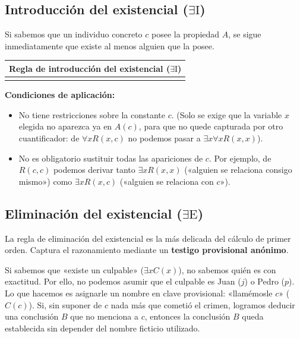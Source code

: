 \subsection{Introducción del existencial \texorpdfstring{($\exists\text{I}$)}{(Introduccion del existencial)}}

Si sabemos que un individuo concreto $c$ posee la propiedad $A$, se sigue inmediatamente que existe al menos alguien que la posee.

\begin{center}
\begin{tabular}{|c|}
\hline
\textbf{Regla de introducción del existencial ($\exists\text{I}$)} \\
\hline
\cajaregla{$\begin{nd}[rules=myrules]
    \have [m] {1} {A(c)} \by{}{}
    \have [\mbox{}] {2} {\exists x A(x)} \Ei{1}
\end{nd}$} \\
\hline
\end{tabular}
\end{center}

\noindent \textbf{Condiciones de aplicación:}
\begin{itemize}
    \item No tiene restricciones sobre la constante $c$. (Solo se exige que la variable $x$ elegida no aparezca ya en $A(c)$, para que no quede capturada por otro cuantificador: de $\forall x R(x, c)$ no podemos pasar a $\exists x \forall x R(x, x)$).
    \item No es obligatorio sustituir todas las apariciones de $c$. Por ejemplo, de $R(c, c)$ podemos derivar tanto $\exists x R(x, x)$ («alguien se relaciona consigo mismo») como $\exists x R(x, c)$ («alguien se relaciona con $c$»).
\end{itemize}

\subsection{Eliminación del existencial \texorpdfstring{($\exists\text{E}$)}{(Eliminacion del existencial)}}

La regla de eliminación del existencial es la más delicada del cálculo de primer orden. Captura el razonamiento mediante un \textbf{testigo provisional anónimo}.

Si sabemos que «existe un culpable» ($\exists x C(x)$), no sabemos quién es con exactitud. Por ello, no podemos asumir que el culpable es Juan ($j$) o Pedro ($p$). Lo que hacemos es asignarle un nombre en clave provisional: «llamémosle $c$» ($C(c)$). Si, sin suponer de $c$ nada más que cometió el crimen, logramos deducir una conclusión $B$ que no menciona a $c$, entonces la conclusión $B$ queda establecida sin depender del nombre ficticio utilizado.

